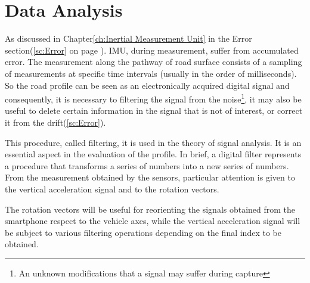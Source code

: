 \documentclass[tesi]{subfiles}
\begin{document}
\chapter{Data Analysis}
\label{ch:Data Analysis}
As discussed in Chapter\ref{ch:Inertial Measurement Unit} in the Error section(\ref{sc:Error} on page \pageref{sc:Error}). IMU, during measurement, suffer from accumulated error. 
The measurement along the pathway of road surface consists of a sampling of measurements at specific time intervals (usually in the order of milliseconds). So the road profile can be seen as an electronically acquired digital signal and consequently, it is necessary to filtering the signal from the noise\footnote{An unknown modifications that a signal may suffer during capture}, it may also be useful to delete certain information in the signal that is not of interest, or correct it from the drift(\ref{sc:Error}).

This procedure, called filtering, it is used in the theory of signal analysis.
It is an essential aspect in the evaluation of the profile\cite{little_book}. In brief, a digital filter represents a procedure that transforms a series of numbers into a new series of numbers\cite{little_book}.
From the measurement obtained by the sensors, particular attention is given to the vertical acceleration signal and to the rotation vectors. 

\noindent The rotation vectors will be useful for reorienting the signals obtained from the smartphone\cite{Andro} respect to the vehicle axes, while the vertical acceleration signal will be subject to various filtering operations depending on the final index to be obtained.
\end{document}
